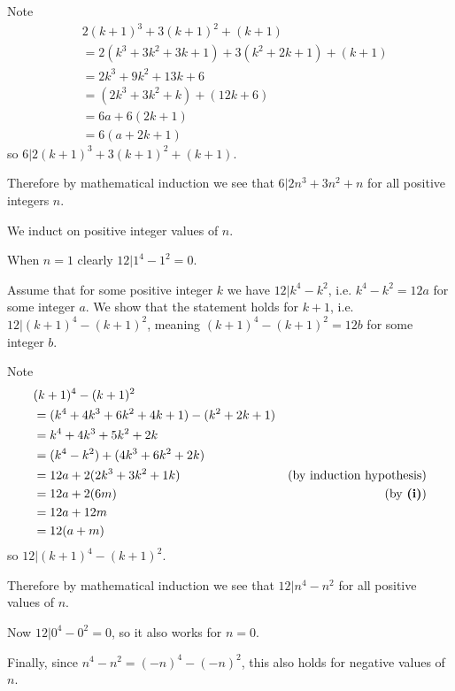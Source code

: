 \begin{questions}
\begin{partquestions}{\roman*}
        Note
        \begin{align*}
            &2(k+1)^3 + 3(k+1)^2 + (k+1)\\
            &= 2(k^3+3k^2+3k+1) + 3(k^2+2k+1) + (k+1)\\
            &= 2k^3 + 9k^2 + 13k + 6\\
            &= (2k^3 + 3k^2 + k) + (12k + 6)\\
            &= 6a + 6(2k + 1)\\
            &= 6(a + 2k + 1)
        \end{align*}
        so $6 \vert 2(k+1)^3 + 3(k+1)^2 + (k+1)$.

        Therefore by mathematical induction we see that $6 \vert 2n^3 + 3n^2 + n$ for all positive integers $n$.

        \item We induct on positive integer values of $n$.

        When $n = 1$ clearly $12 \vert 1^4 - 1^2 = 0$.

        Assume that for some positive integer $k$ we have $12 \vert k^4 - k^2$, i.e. $k^4 - k^2 = 12a$ for some integer $a$. We show that the statement holds for $k+1$, i.e. $12 \vert (k+1)^4 - (k+1)^2$, meaning $(k+1)^4 - (k+1)^2 = 12b$ for some integer $b$.

        Note
        \begin{align*}
            &(k+1)^4 - (k+1)^2\\
            &= (k^4 + 4k^3 + 6k^2 + 4k + 1) - (k^2 + 2k + 1)\\
            &= k^4 + 4k^3 + 5k^2 + 2k\\
            &= (k^4 - k^2) + (4k^3 + 6k^2 + 2k)\\
            &= 12a + 2(2k^3 + 3k^2 + 1k) & (\text{by induction hypothesis})\\
            &= 12a + 2(6m) & (\text{by \textbf{(i)}})\\
            &= 12a + 12m\\
            &= 12(a+m)
        \end{align*}
        so $12 \vert (k+1)^4 - (k+1)^2$.

        Therefore by mathematical induction we see that $12 \vert n^4 - n^2$ for all positive values of $n$.

        Now $12 \vert 0^4 - 0^2 = 0$, so it also works for $n = 0$.

        Finally, since $n^4 - n^2 = (-n)^4 - (-n)^2$, this also holds for negative values of $n$.
    \end{partquestions}


\end{questions}
